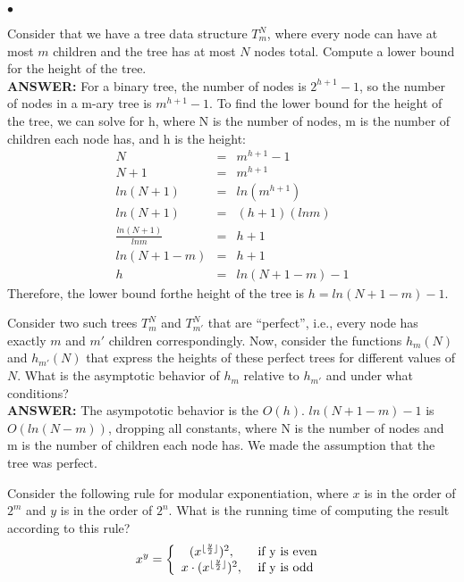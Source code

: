 \documentclass{article}
\newenvironment{myitem}{\begin{list}{$\bullet$}
{\setlength{\itemsep}{-0pt}
\setlength{\topsep}{0pt}
\setlength{\labelwidth}{0pt}
\setlength{\leftmargin}{10pt}
\setlength{\parsep}{-0pt}
\setlength{\itemsep}{0pt}
\setlength{\partopsep}{0pt}}}%
{\end{list}}
\begin{document}
\begin{myitem}
\item Consider that we have a tree data structure $T_m^N$, where every
  node can have at most $m$ children and the tree has at most $N$
  nodes total. Compute a lower bound for the height of the tree.\\

{\bfseries ANSWER: }For a binary tree, the number of nodes is $2^{h+1}-1$, so the number of nodes in a m-ary tree is $m^{h+1}-1$. To find the lower bound for the height of the tree, we can solve for h, where N is the number of nodes, m is the number of children each node has, and h is the height:
\begin{eqnarray*}
	N &=& m^{h+1}-1\\
	N+1 &=& m^{h+1}\\
	ln(N+1) &=& ln(m^{h+1})\\
	ln(N+1) &=& (h+1)(lnm)\\
	\frac{ln(N+1)}{lnm} &=& h+1\\
	ln(N+1-m) &=& h+1\\
	h &=& ln(N+1-m)-1
\end{eqnarray*}
Therefore, the lower bound forthe height of the tree is $h=ln(N+1-m)-1$.\\

\item Consider two such trees $T_m^N$ and $T_{m'}^N$ that are
  ``perfect'', i.e., every node has exactly $m$ and $m'$ children
  correspondingly. Now, consider the functions $h_m(N)$ and
  $h_{m'}(N)$ that express the heights of these perfect trees for
  different values of $N$. What is the asymptotic behavior of $h_m$
  relative to $h_{m'}$ and under what conditions?\\

{\bfseries ANSWER: }The asympototic behavior is the $O(h)$. $ln(N+1-m)-1$ is $O(ln(N-m))$, dropping all constants, where N is the number of nodes and m is the number of children each node has. We made the assumption that the tree was perfect. \\

\item Consider the following rule for modular exponentiation, where
  $x$ is in the order of $2^m$ and $y$ is in the order of $2^n$. What
  is the running time of computing the result according to this rule?
$$x^y = \left\{
\begin{array}{c l}     
    (x ^{\lfloor \frac{y}{2} \rfloor} )^2,  & \textrm{ if y is even }\\
    x \cdot (x^{\lfloor \frac{y}{2} \rfloor} )^2, & \textrm{ if y is odd}
\end{array}\right.$$



\end{myitem}
\end{document}
